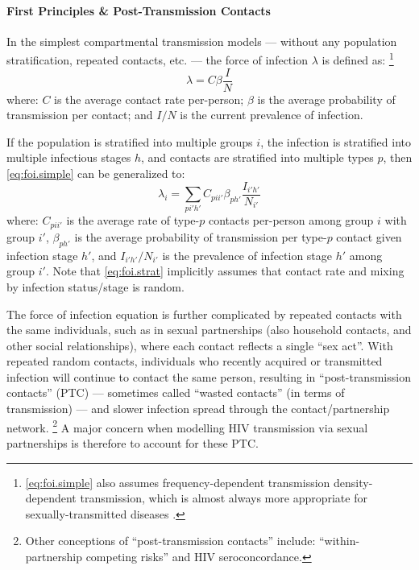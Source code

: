 \paragraph{First Principles \& Post-Transmission Contacts}
In the simplest compartmental transmission models
--- \ie without any population stratification, repeated contacts, etc. ---
the force of infection $\lambda$ is defined as:%
\footnote{\eqref{eq:foi.simple} also assumes
  frequency-dependent transmission \vs density-dependent transmission,
  which is almost always more appropriate for sexually-transmitted diseases \cite{Begon2002}.}
\begin{equation}\label{eq:foi.simple}
  \lambda = C \beta \frac{I}{N}
\end{equation} where:
$C$ is the average contact rate per-person;
$\beta$ is the average probability of transmission per contact; and
$I/N$ is the current prevalence of infection.
\par
If the population is stratified into multiple groups $i$,
the infection is stratified into multiple infectious stages $h$,
and contacts are stratified into multiple types $p$,
then \eqref{eq:foi.simple} can be generalized to:
\begin{equation}\label{eq:foi.strat}
  \lambda_i = \sum_{pi'h'} C_{pii'} \beta_{ph'} \frac{I_{i'h'}}{N_{i'}}
\end{equation}
\clearpage %
where:
$C_{pii'}$ is the average rate of type-$p$ contacts per-person among group $i$ with group $i'$,
$\beta_{ph'}$ is the average probability of transmission per type-$p$ contact given infection stage $h'$,
and $I_{i'h'}/N_{i'}$ is the prevalence of infection stage $h'$ among group $i'$.
Note that \eqref{eq:foi.strat} implicitly assumes that
contact rate and mixing by infection status/stage is random.
\par
The force of infection equation is further complicated by
repeated contacts with the same individuals, such as in sexual partnerships
(also household contacts, and other social relationships),
where each contact reflects a single ``sex act''.
With repeated \vs random contacts, individuals who recently acquired or transmitted infection
will continue to contact the same person, resulting in ``post-transmission contacts'' (PTC)
--- sometimes called ``wasted contacts'' (in terms of transmission) ---
and slower infection spread through the contact/partnership network.%
\footnote{Other conceptions of ``post-transmission contacts'' include:
  ``within-partnership competing risks'' and HIV seroconcordance.}
A major concern when modelling HIV transmission via sexual partnerships
is therefore to account for these PTC.
